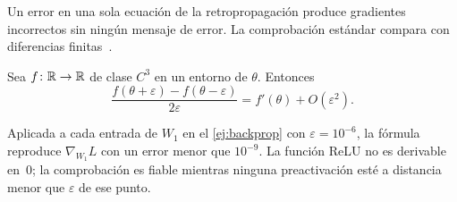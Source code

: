 Un error en una sola ecuación de la retropropagación produce gradientes incorrectos sin ningún mensaje de error. La comprobación estándar compara con diferencias finitas~\cite{cs231n}.

\begin{proposicion}\label{prop:centradas}
Sea $f\colon\mathbb{R}\to\mathbb{R}$ de clase $C^{3}$ en un entorno de $\theta$. Entonces
\[
\frac{f(\theta+\varepsilon)-f(\theta-\varepsilon)}{2\varepsilon}=f'(\theta)+O(\varepsilon^{2}).
\]
\end{proposicion}

Aplicada a cada entrada de $W_1$ en el \cref{ej:backprop} con $\varepsilon=10^{-6}$, la fórmula reproduce $\nabla_{\!W_1}L$ con un error menor que $10^{-9}$. La función ReLU no es derivable en~0; la comprobación es fiable mientras ninguna preactivación esté a distancia menor que $\varepsilon$ de ese punto.

